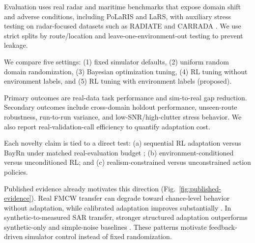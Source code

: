 Evaluation uses real radar and maritime benchmarks that expose domain shift and adverse conditions, including PoLaRIS and LaRS, with auxiliary stress testing on radar-focused datasets such as RADIATE and CARRADA \cite{choi2024polaris,zust2023lars,sheeny2020radiate,ouaknine2020carrada,schumann2021radarscenes}. We use strict splits by route/location and leave-one-environment-out testing to prevent leakage.

We compare five settings: (1) fixed simulator defaults, (2) uniform random domain randomization, (3) Bayesian optimization tuning, (4) RL tuning without environment labels, and (5) RL tuning with environment labels (proposed).

Primary outcomes are real-data task performance and sim-to-real gap reduction. Secondary outcomes include cross-domain holdout performance, unseen-route robustness, run-to-run variance, and low-SNR/high-clutter stress behavior. We also report real-validation-call efficiency to quantify adaptation cost.

Each novelty claim is tied to a direct test: (a) sequential RL adaptation versus BayRn under matched real-evaluation budget \cite{muratore2020bayrn}; (b) environment-conditioned versus unconditioned RL; and (c) realism-constrained versus unconstrained action policies.

Published evidence already motivates this direction (Fig.~\ref{fig:published-evidence}). Real FMCW transfer can degrade toward chance-level behavior without adaptation, while calibrated adaptation improves substantially \cite{trinh2026digitaltwin}. In synthetic-to-measured SAR transfer, stronger structured adaptation outperforms synthetic-only and simple-noise baselines \cite{kim2024soft}. These patterns motivate feedback-driven simulator control instead of fixed randomization.
